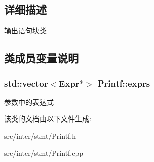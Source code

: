 \subsection{详细描述}
输出语句块类 

\subsection{类成员变量说明}
\subsubsection[{\texorpdfstring{exprs}{exprs}}]{\setlength{\rightskip}{0pt plus 5cm}std\+::vector$<${\bf Expr}$\ast$$>$ Printf\+::exprs}\hypertarget{class_printf_ab07a181eb9cd79c9018e172332d44ce5}{}\label{class_printf_ab07a181eb9cd79c9018e172332d44ce5}
参数中的表达式 

该类的文档由以下文件生成\+:\begin{DoxyCompactItemize}
\item 
src/inter/stmt/Printf.\+h\item 
src/inter/stmt/Printf.\+cpp\end{DoxyCompactItemize}
